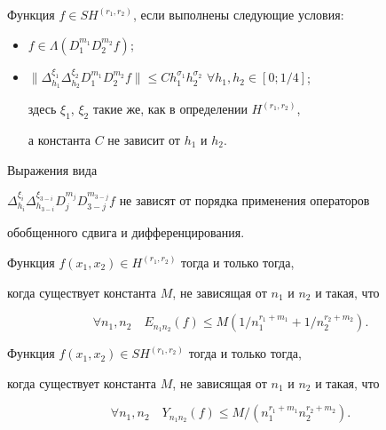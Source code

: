 \noindent


Функция $f\in SH^{(r_1,r_2)}$, если выполнены следующие условия:


\begin{itemize}


\item[1)]


$f\in \Lambda (D_1^{m_1} D_2^{m_2} f )$;


\item[2)]


$\|\Delta_{h_1}^{\xi_1}\Delta_{h_2}^{\xi_2}D_1^{m_1}D_2^{m_2}f\|\le


Ch_1^{\sigma_1}h_2^{\sigma_2}$ $\forall h_1, h_2\in [0;1/4]$;


здесь $\xi_1$, $\xi_2$ такие же, как в определении $H^{(r_1,r_2)}$,


а константа $C$ не зависит от $h_1$ и $h_2$.


\end{itemize}





\begin{notenonum} Выражения вида


$\Delta_{h_i}^{\xi_i}\Delta_{h_{3-i}}^{\xi_{3-i}}D_j^{m_j}


D_{3-j}^{m_{3-j}}f$ не зависят от порядка применения операторов 


обобщенного сдвига и дифференцирования.


\end{notenonum}





\begin{thm}


Функция $f(x_1,x_2)\in H^{(r_1,r_2)}$ тогда и только тогда, 


когда существует константа $M$, не зависящая от $n_1$ и $n_2$ и такая, что


$$


\forall n_1, n_2\quad E_{n_1 n_2}(f)\le M


(1/n_1^{r_1+m_1}+1/n_2^{r_2+m_2}).


$$


\end{thm}





\begin{thm}


Функция $f(x_1,x_2)\in SH^{( r_1, r_2)}$ тогда и только тогда, 


когда существует константа $M$, не зависящая от $n_1$ и $n_2$ и такая, что 


$$


\forall n_1, n_2\quad Y_{n_1 n_2}(f)\le M/(n_1^{r_1+m_1}n_2^{r_2+m_2}).


$$


\end{thm}





